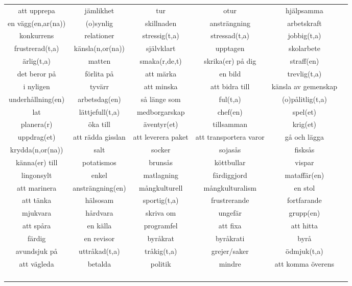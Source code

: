 \begin{center}
    \begin{adjustwidth}{-2.2cm}{}
        \begin{tabular}{|c c c c c c|}
            \hline
            att upprepa & jämlikhet & tur & otur & hjälpsamma & \\
            en vägg(en,ar(na)) & (o)synlig & skillnaden & ansträngning & arbetskraft & \\
            konkurrens & relationer & stressig(t,a) & stressad(t,a) & jobbig(t,a) & \\
            frustrerad(t,a) & känsla(n,or(na)) & självklart & upptagen & skolarbete & \\
            ärlig(t,a) & matten & smaka(r,de,t) & skrika(er) på dig & straff(en) & \\
            det beror på & förlita på & att märka & en bild & trevlig(t,a) & \\
            i nyligen & tyvärr & att minska & att bidra till & känsla av gemenskap & \\
            underhållning(en) & arbetsdag(en) & så länge som & ful(t,a) & (o)pålitlig(t,a) & \\
            lat & lättjefull(t,a) & medborgarskap & chef(en) & spel(et) & \\
            planera(r) & öka till & äventyr(et) & tillsamman & krig(et) & \\
            uppdrag(et) & att rädda gisslan & att leverera paket & att transportera varor & gå och lägga & \\
            krydda(n,or(na)) & salt & socker & sojasås & fisksås & \\
            känna(er) till & potatismos & brunsås & köttbullar & vispar & \\
            lingonsylt & enkel & matlagning & färdiggjord & mataffär(en) & \\
            att marinera & ansträngning(en) & mångkulturell & mångkulturalism & en stol & \\
            att tänka & hälsosam & sportig(t,a) & frustrerande & fortfarande & \\
            mjukvara & hårdvara & skriva om & ungefär & grupp(en) & \\
            att spåra & en källa & programfel & att fixa & att hitta & \\
            färdig & en revisor & byråkrat & byråkrati & byrå & \\
            avundsjuk på & uttråkad(t,a) & tråkig(t,a) & grejer/saker & ödmjuk(t,a) & \\
            att vägleda & betalda & politik & mindre & att komma överens & \\
             &  &  &  &  & \\
             &  &  &  &  & \\
             &  &  &  &  & \\
             &  &  &  &  & \\
            \hline
        \end{tabular}
    \end{adjustwidth}
\end{center}


